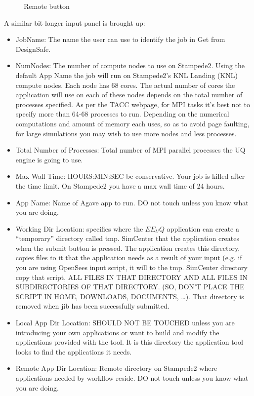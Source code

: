 \begin{figure}[!htbp]
  \caption{Remote button}
  \label{fig:figure16}
\end{figure}

A similar bit longer input panel is brought up:
\begin{itemize}
\item JobName: The name the user can use to identify the job in Get from DesignSafe.
\item NumNodes: The number of compute nodes to use on Stampede2. Using the default App Name the job will run on Stampede2’s KNL Landing (KNL) 
compute nodes. Each node has 68 cores. The actual number of cores the application will use on each of these nodes depends on the total number of 
processes specified. As per the TACC webpage, for MPI tasks it’s best not to specify more than 64-68 processes to run. Depending on the numerical 
computations and amount of memory each uses, so as to avoid page faulting, for large simulations you may wish to use more nodes and less processes.
\item Total Number of Processes: Total number of MPI parallel processes the UQ engine is going to use.
\item Max Wall Time:  HOURS:MIN:SEC be conservative. Your job is killed after the time limit. On Stampede2 you have a max wall time of 24 hours.
\item App Name:   Name of Agave app to run. DO not touch unless you know what you are doing.
\item Working Dir Location: specifies where the $EE_UQ$ application can create a “temporary” directory called tmp. SimCenter that the application 
creates when the submit button is pressed. The application creates this directory, copies files to it that the application needs as a result of your 
input (e.g. if you are using OpenSees input script, it will to the tmp. SimCenter directory copy that script, ALL FILES IN THAT DIRECTORY AND ALL FILES 
IN SUBDIRECTORIES OF THAT DIRECTORY. (SO, DON’T PLACE THE SCRIPT IN HOME, DOWNLOADS, DOCUMENTS, …). That directory is removed when jib has been successfully submitted.
\item Local App Dir Location: SHOULD NOT BE TOUCHED unless you are introducing your own applications or want to build and modify the applications 
provided with the tool. It is this directory the application tool looks to find the applications it needs.
\item Remote App Dir Location: Remote directory on Stampede2 where applications needed by workflow reside. DO not touch unless you know what you are doing.

\end{itemize}


